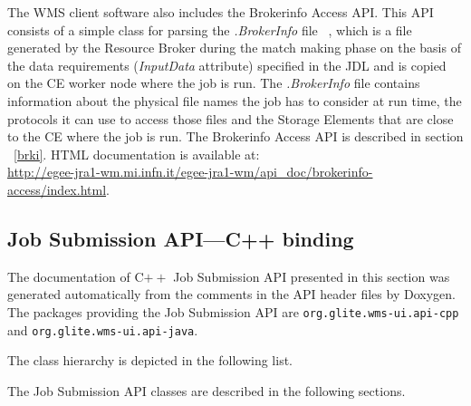 \documentclass{egee}
\begin{document}
The WMS client software also includes the Brokerinfo Access API.
This API  consists of a simple class for parsing the \textit{.BrokerInfo} file ~\cite{brokerinfo}, which is a file 
generated by the Resource Broker during the match making phase on the basis of the data requirements 
(\textit{InputData} attribute) specified in the JDL and is copied on the CE worker node where the job is run. 
The \textit{.BrokerInfo} file contains information about the physical file names the job has to consider at run time, 
the protocols it can use to access those files and the Storage Elements that are close to the CE where the job is run.  
The Brokerinfo Access API is described in section ~\ref{brki}. HTML documentation is available at: \\
\url{http://egee-jra1-wm.mi.infn.it/egee-jra1-wm/api_doc/brokerinfo-access/index.html}. 

\newpage
\subsection{Job Submission API---C++ binding}
\label{jscpp}
{
\renewenvironment{CompactList}{\itemize\itemsep -2pt}{\enditemize}
\def\section#1{}
\renewcommand{\contentsline}[4]{{\bf #2}\leaders\hbox{.}\hfill #3}
The documentation of C$++$ Job Submission API presented in this section was generated automatically from the 
comments in the API header files by Doxygen. The packages providing the Job Submission API are 
{\verb!org.glite.wms-ui.api-cpp!} and {\verb!org.glite.wms-ui.api-java!}.

The class hierarchy is depicted in the following list.

}

\noindent The Job Submission API classes are described in the
following sections.
{

\let\ddescription=\description
\let\denddescription=\enddescription
\renewenvironment{description}{\list{}{\labelwidth 4cm\leftmargin 4cm}}{\endlist}



















}
\end{document}

